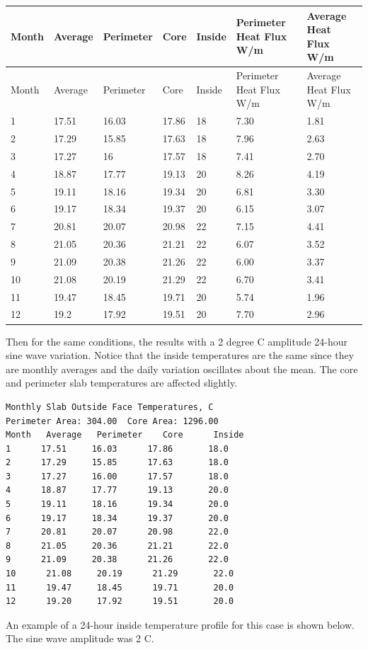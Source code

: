 \begin{longtable}[c]{p{0.85in}p{0.85in}p{0.85in}p{0.85in}p{0.85in}p{0.85in}p{0.85in}}
\toprule 
Month & Average & Perimeter & Core & Inside & Perimeter Heat Flux W/m & Average Heat Flux W/m \tabularnewline
\midrule
\endfirsthead

\toprule 
Month & Average & Perimeter & Core & Inside & Perimeter Heat Flux W/m & Average Heat Flux W/m \tabularnewline
\midrule
\endhead

1 & 17.51 & 16.03 & 17.86 & 18 & 7.30 & 1.81 \tabularnewline
2 & 17.29 & 15.85 & 17.63 & 18 & 7.96 & 2.63 \tabularnewline
3 & 17.27 & 16 & 17.57 & 18 & 7.41 & 2.70 \tabularnewline
4 & 18.87 & 17.77 & 19.13 & 20 & 8.26 & 4.19 \tabularnewline
5 & 19.11 & 18.16 & 19.34 & 20 & 6.81 & 3.30 \tabularnewline
6 & 19.17 & 18.34 & 19.37 & 20 & 6.15 & 3.07 \tabularnewline
7 & 20.81 & 20.07 & 20.98 & 22 & 7.15 & 4.41 \tabularnewline
8 & 21.05 & 20.36 & 21.21 & 22 & 6.07 & 3.52 \tabularnewline
9 & 21.09 & 20.38 & 21.26 & 22 & 6.00 & 3.37 \tabularnewline
10 & 21.08 & 20.19 & 21.29 & 22 & 6.70 & 3.41 \tabularnewline
11 & 19.47 & 18.45 & 19.71 & 20 & 5.74 & 1.96 \tabularnewline
12 & 19.2 & 17.92 & 19.51 & 20 & 7.70 & 2.96 \tabularnewline
\bottomrule
\end{longtable}

Then for the same conditions, the results with a 2 degree C amplitude 24-hour sine wave variation. Notice that the inside temperatures are the same since they are monthly averages and the daily variation oscillates about the mean. The core and perimeter slab temperatures are affected slightly.

\begin{lstlisting}
Monthly Slab Outside Face Temperatures, C
Perimeter Area: 304.00  Core Area: 1296.00
Month   Average   Perimeter    Core      Inside
1      17.51     16.03      17.86       18.0
2      17.29     15.85      17.63       18.0
3      17.27     16.00      17.57       18.0
4      18.87     17.77      19.13       20.0
5      19.11     18.16      19.34       20.0
6      19.17     18.34      19.37       20.0
7      20.81     20.07      20.98       22.0
8      21.05     20.36      21.21       22.0
9      21.09     20.38      21.26       22.0
10      21.08     20.19      21.29       22.0
11      19.47     18.45      19.71       20.0
12      19.20     17.92      19.51       20.0
\end{lstlisting}

An example of a 24-hour inside temperature profile for this case is shown below. The sine wave amplitude was 2 C.

